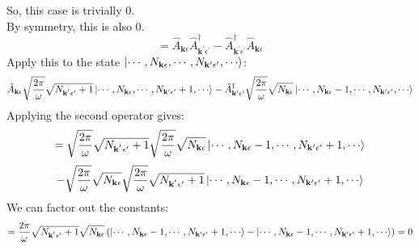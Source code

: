\documentclass[12pt]{article}
\begin{document}
So, this case is trivially 0.\\
\begin{equation}
  [\hat{A}_{\mathbf{k} \epsilon}^{\dagger},\hat{A}_{\mathbf{k^{\prime}} \epsilon^{\prime}}^{\dagger}]
\end{equation}
By symmetry, this is also 0.\\
\begin{equation}
  [\hat{A}_{\mathbf{k} \epsilon},\hat{A}^\dagger_{\mathbf{k^{\prime}} \epsilon^{\prime}}] = \hat{A}_{\mathbf{k} \epsilon}\hat{A}^\dagger_{\mathbf{k^{\prime}} \epsilon^{\prime}} - \hat{A}^\dagger_{\mathbf{k^{\prime}} \epsilon^{\prime}}\hat{A}_{\mathbf{k} \epsilon}
\end{equation}
Apply this to the state $\ket{\cdots ,N_{\mathbf{k} \epsilon}, \cdots, N_{\mathbf{k^{\prime}} \epsilon^{\prime}}, \cdots}$:
\begin{equation}
  \hat{A}_{\mathbf{k} \epsilon}\sqrt{\frac{2\pi}{\omega }} \sqrt{N_{\mathbf{k^{^{\prime}}\epsilon^{\prime}}}+1}\ket{\cdots ,N_{\mathbf{k} \epsilon}, \cdots, N_{\mathbf{k^{\prime}} \epsilon^{\prime}}+1, \cdots} - \hat{A}^\dagger_{\mathbf{k^{\prime}} \epsilon^{\prime}}\sqrt{\frac{2\pi}{\omega }} \sqrt{N_{\mathbf{k} \epsilon}}\ket{\cdots ,N_{\mathbf{k} \epsilon}-1, \cdots, N_{\mathbf{k^{\prime}} \epsilon^{\prime}}, \cdots}
\end{equation}
Applying the second operator gives:
\begin{equation}
  =\sqrt{\frac{2\pi}{\omega }} \sqrt{N_{\mathbf{k^{^{\prime}}\epsilon^{\prime}}}+1}\sqrt{\frac{2\pi}{\omega }} \sqrt{N_{\mathbf{k} \epsilon}}\ket{\cdots ,N_{\mathbf{k} \epsilon}-1, \cdots, N_{\mathbf{k^{\prime}} \epsilon^{\prime}}+1, \cdots}
\end{equation}
\begin{equation}
  - \sqrt{\frac{2\pi}{\omega }} \sqrt{N_{\mathbf{k} \epsilon}}\sqrt{\frac{2\pi}{\omega }} \sqrt{N_{\mathbf{k^{^{\prime}}\epsilon^{\prime}}}+1}\ket{\cdots ,N_{\mathbf{k} \epsilon}-1, \cdots, N_{\mathbf{k^{\prime}} \epsilon^{\prime}}+1, \cdots}
\end{equation}
We can factor out the constants:
\begin{equation}
  = \frac{2\pi}{\omega } \sqrt{N_{\mathbf{k^{^{\prime}}\epsilon^{\prime}}}+1}\sqrt{N_{\mathbf{k} \epsilon}}\left( \ket{\cdots ,N_{\mathbf{k} \epsilon}-1, \cdots, N_{\mathbf{k^{\prime}} \epsilon^{\prime}}+1, \cdots} - \ket{\cdots ,N_{\mathbf{k} \epsilon}-1, \cdots, N_{\mathbf{k^{\prime}} \epsilon^{\prime}}+1, \cdots}\right) = 0
\end{equation}
\end{document}
